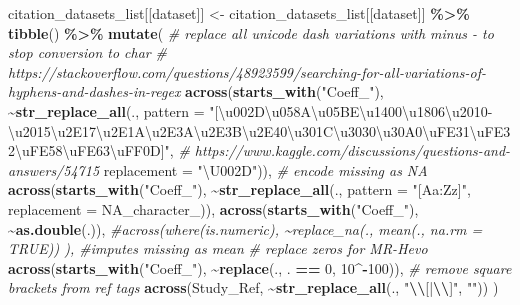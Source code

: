 \documentclass[
]{article}
\newenvironment{Shaded}{\begin{snugshade}}{\end{snugshade}}
\newcommand{\AttributeTok}[1]{\textcolor[rgb]{0.13,0.29,0.53}{#1}}
\newcommand{\CommentTok}[1]{\textcolor[rgb]{0.56,0.35,0.01}{\textit{#1}}}
\newcommand{\ConstantTok}[1]{\textcolor[rgb]{0.56,0.35,0.01}{#1}}
\newcommand{\DecValTok}[1]{\textcolor[rgb]{0.00,0.00,0.81}{#1}}
\newcommand{\FunctionTok}[1]{\textcolor[rgb]{0.13,0.29,0.53}{\textbf{#1}}}
\newcommand{\NormalTok}[1]{#1}
\newcommand{\OtherTok}[1]{\textcolor[rgb]{0.56,0.35,0.01}{#1}}
\newcommand{\SpecialCharTok}[1]{\textcolor[rgb]{0.81,0.36,0.00}{\textbf{#1}}}
\newcommand{\StringTok}[1]{\textcolor[rgb]{0.31,0.60,0.02}{#1}}
\begin{document}
\begin{Shaded}
\begin{Highlighting}[]
\NormalTok{  citation\_datasets\_list[[dataset]] }\OtherTok{\textless{}{-}}\NormalTok{ citation\_datasets\_list[[dataset]] }\SpecialCharTok{\%\textgreater{}\%} 
    \FunctionTok{tibble}\NormalTok{() }\SpecialCharTok{\%\textgreater{}\%} 
    \FunctionTok{mutate}\NormalTok{(}
      \CommentTok{\# replace all unicode dash variations with minus {-} to stop conversion to char}
      \CommentTok{\# https://stackoverflow.com/questions/48923599/searching{-}for{-}all{-}variations{-}of{-}hyphens{-}and{-}dashes{-}in{-}regex}
      \FunctionTok{across}\NormalTok{(}\FunctionTok{starts\_with}\NormalTok{(}\StringTok{"Coeff\_"}\NormalTok{), }
             \SpecialCharTok{\textasciitilde{}}\FunctionTok{str\_replace\_all}\NormalTok{(.,}
                              \AttributeTok{pattern =} \StringTok{"[\textbackslash{}u002D\textbackslash{}u058A\textbackslash{}u05BE\textbackslash{}u1400\textbackslash{}u1806\textbackslash{}u2010{-}\textbackslash{}u2015\textbackslash{}u2E17\textbackslash{}u2E1A\textbackslash{}u2E3A\textbackslash{}u2E3B\textbackslash{}u2E40\textbackslash{}u301C\textbackslash{}u3030\textbackslash{}u30A0\textbackslash{}uFE31\textbackslash{}uFE32\textbackslash{}uFE58\textbackslash{}uFE63\textbackslash{}uFF0D]"}\NormalTok{, }
                              \CommentTok{\# https://www.kaggle.com/discussions/questions{-}and{-}answers/54715}
                              \AttributeTok{replacement =} \StringTok{"\textbackslash{}U002D"}\NormalTok{)),}
      \CommentTok{\# encode missing as NA }
      \FunctionTok{across}\NormalTok{(}\FunctionTok{starts\_with}\NormalTok{(}\StringTok{"Coeff\_"}\NormalTok{), }\SpecialCharTok{\textasciitilde{}}\FunctionTok{str\_replace\_all}\NormalTok{(., }\AttributeTok{pattern =} \StringTok{"[Aa:Zz]"}\NormalTok{, }\AttributeTok{replacement =} \ConstantTok{NA\_character\_}\NormalTok{)),}
      \FunctionTok{across}\NormalTok{(}\FunctionTok{starts\_with}\NormalTok{(}\StringTok{"Coeff\_"}\NormalTok{), }\SpecialCharTok{\textasciitilde{}}\FunctionTok{as.double}\NormalTok{(.)),}
      \CommentTok{\#across(where(is.numeric), \textasciitilde{}replace\_na(., mean(., na.rm = TRUE)) ), \#imputes missing as mean}
      \CommentTok{\# replace zeros for MR{-}Hevo}
      \FunctionTok{across}\NormalTok{(}\FunctionTok{starts\_with}\NormalTok{(}\StringTok{"Coeff\_"}\NormalTok{), }\SpecialCharTok{\textasciitilde{}}\FunctionTok{replace}\NormalTok{(., . }\SpecialCharTok{==} \DecValTok{0}\NormalTok{, }\DecValTok{10}\SpecialCharTok{\^{}{-}}\DecValTok{100}\NormalTok{)), }
      \CommentTok{\# remove square brackets from ref tags}
      \FunctionTok{across}\NormalTok{(Study\_Ref, }\SpecialCharTok{\textasciitilde{}}\FunctionTok{str\_replace\_all}\NormalTok{(., }\StringTok{"}\SpecialCharTok{\textbackslash{}\textbackslash{}}\StringTok{[|}\SpecialCharTok{\textbackslash{}\textbackslash{}}\StringTok{]"}\NormalTok{, }\StringTok{""}\NormalTok{))}
\NormalTok{    )}
    

\end{Highlighting}
\end{Shaded}
\end{document}
